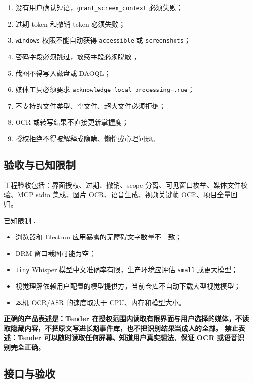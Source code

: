 \documentclass[UTF8,a4paper,11pt]{ctexart}
\newcommand{\hl}[1]{\textcolor{blue!70!black}{\textbf{#1}}}
\newcommand{\warn}[1]{\textcolor{red!70!black}{\textbf{#1}}}
\begin{document}
\begin{enumerate}
\item 没有用户确认短语，\texttt{grant\_screen\_context} 必须失败；
\item 过期 token 和撤销 token 必须失败；
\item \texttt{windows} 权限不能自动获得 \texttt{accessible} 或 \texttt{screenshots}；
\item 密码字段必须跳过，敏感字段必须脱敏；
\item 截图不得写入磁盘或 DAOQL；
\item 媒体工具必须要求 \texttt{acknowledge\_local\_processing=true}；
\item 不支持的文件类型、空文件、超大文件必须拒绝；
\item OCR 或转写结果不直接更新掌握度；
\item 授权拒绝不得被解释成隐瞒、懒惰或心理问题。
\end{enumerate}

\subsection{验收与已知限制}

工程验收包括：界面授权、过期、撤销、scope 分离、可见窗口枚举、媒体文件校验、MCP stdio 集成、图片 OCR、语音生成、视频关键帧 OCR、项目全量回归。

已知限制：

\begin{itemize}
\item 浏览器和 Electron 应用暴露的无障碍文字数量不一致；
\item DRM 窗口截图可能为空；
\item \texttt{tiny} Whisper 模型中文准确率有限，生产环境应评估 \texttt{small} 或更大模型；
\item 视觉理解依赖用户配置的模型提供方，当前仓库不自动下载大型视觉模型；
\item 本机 OCR/ASR 的速度取决于 CPU、内存和模型大小。
\end{itemize}

\hl{正确的产品表述是：Tender 在授权范围内读取有限界面与用户选择的媒体，不读取隐藏内容，不把原文写进长期事件库，也不把识别结果当成人的全部。}
\warn{禁止表述：Tender 可以随时读取任何屏幕、知道用户真实想法、保证 OCR 或语音识别完全正确。}

\subsection{接口与验收}
\end{document}
